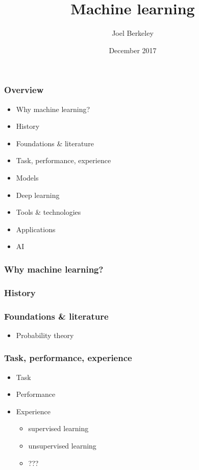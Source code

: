 \documentclass[xcolor={dvipsnames}]{beamer}
\author{Joel Berkeley}
\title{Machine learning}
\institute{Verimatrix Bristol}
\date{December 2017}
\begin{document}
\begin{frame}
  \maketitle
\end{frame}

\begin{frame}
  \frametitle{Overview}
  \begin{itemize}
    \item<+-> Why machine learning?
    \item<+-> History
    \item<+-> Foundations \& literature
    \item<+-> Task, performance, experience
    \item<+-> Models
    \item<+-> Deep learning
    \item<+-> Tools \& technologies
    \item<+-> Applications
    \item<+-> AI
  \end{itemize}
\end{frame}

\begin{frame}
  \frametitle{Why machine learning?}
\end{frame}

\begin{frame}
  \frametitle{History}
\end{frame}

\begin{frame}
  \frametitle{Foundations \& literature}
  \begin{itemize}
    \item Probability theory
  \end{itemize}
\end{frame}

\begin{frame}
  \frametitle{Task, performance, experience}
  \begin{itemize}
    \item<+-> Task
    \item<+-> Performance
    \item<+-> Experience
      \begin{itemize}
        \item supervised learning
        \item unsupervised learning
        \item ???
      \end{itemize}
  \end{itemize}
\end{frame}
\end{document}
